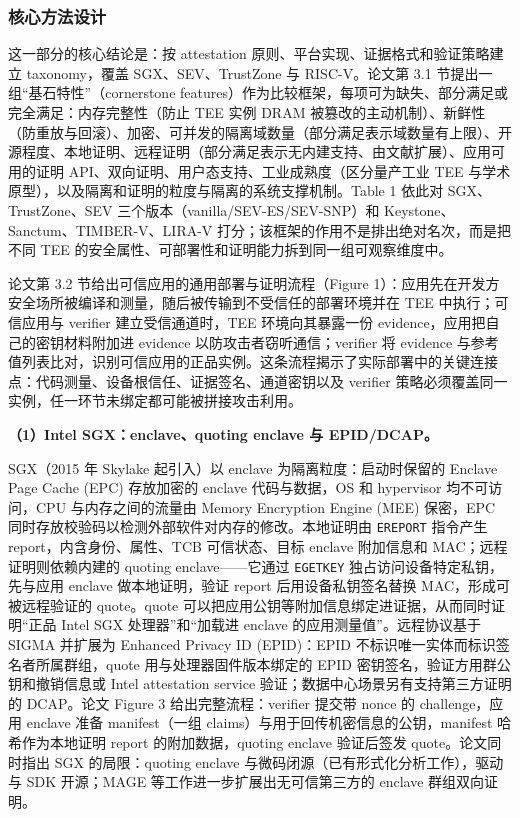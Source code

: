 \documentclass[11pt]{ctexart}
\begin{document}
\subsubsection{核心方法设计}
这一部分的核心结论是：按 attestation 原则、平台实现、证据格式和验证策略建立 taxonomy，覆盖 SGX、SEV、TrustZone 与 RISC-V。论文第 3.1 节提出一组“基石特性”（cornerstone features）作为比较框架，每项可为缺失、部分满足或完全满足：内存完整性（防止 TEE 实例 DRAM 被篡改的主动机制）、新鲜性（防重放与回滚）、加密、可并发的隔离域数量（部分满足表示域数量有上限）、开源程度、本地证明、远程证明（部分满足表示无内建支持、由文献扩展）、应用可用的证明 API、双向证明、用户态支持、工业成熟度（区分量产工业 TEE 与学术原型），以及隔离和证明的粒度与隔离的系统支撑机制。Table 1 依此对 SGX、TrustZone、SEV 三个版本（vanilla/SEV-ES/SEV-SNP）和 Keystone、Sanctum、TIMBER-V、LIRA-V 打分；该框架的作用不是排出绝对名次，而是把不同 TEE 的安全属性、可部署性和证明能力拆到同一组可观察维度中。\par
论文第 3.2 节给出可信应用的通用部署与证明流程（Figure 1）：应用先在开发方安全场所被编译和测量，随后被传输到不受信任的部署环境并在 TEE 中执行；可信应用与 verifier 建立受信通道时，TEE 环境向其暴露一份 evidence，应用把自己的密钥材料附加进 evidence 以防攻击者窃听通信；verifier 将 evidence 与参考值列表比对，识别可信应用的正品实例。这条流程揭示了实际部署中的关键连接点：代码测量、设备根信任、证据签名、通道密钥以及 verifier 策略必须覆盖同一实例，任一环节未绑定都可能被拼接攻击利用。\par
\noindent\textbf{（1）Intel SGX：enclave、quoting enclave 与 EPID/DCAP。}\par
SGX（2015 年 Skylake 起引入）以 enclave 为隔离粒度：启动时保留的 Enclave Page Cache (EPC) 存放加密的 enclave 代码与数据，OS 和 hypervisor 均不可访问，CPU 与内存之间的流量由 Memory Encryption Engine (MEE) 保密，EPC 同时存放校验码以检测外部软件对内存的修改。本地证明由 \texttt{EREPORT} 指令产生 report，内含身份、属性、TCB 可信状态、目标 enclave 附加信息和 MAC；远程证明则依赖内建的 quoting enclave——它通过 \texttt{EGETKEY} 独占访问设备特定私钥，先与应用 enclave 做本地证明，验证 report 后用设备私钥签名替换 MAC，形成可被远程验证的 quote。quote 可以把应用公钥等附加信息绑定进证据，从而同时证明“正品 Intel SGX 处理器”和“加载进 enclave 的应用测量值”。远程协议基于 SIGMA 并扩展为 Enhanced Privacy ID (EPID)：EPID 不标识唯一实体而标识签名者所属群组，quote 用与处理器固件版本绑定的 EPID 密钥签名，验证方用群公钥和撤销信息或 Intel attestation service 验证；数据中心场景另有支持第三方证明的 DCAP。论文 Figure 3 给出完整流程：verifier 提交带 nonce 的 challenge，应用 enclave 准备 manifest（一组 claims）与用于回传机密信息的公钥，manifest 哈希作为本地证明 report 的附加数据，quoting enclave 验证后签发 quote。论文同时指出 SGX 的局限：quoting enclave 与微码闭源（已有形式化分析工作），驱动与 SDK 开源；MAGE 等工作进一步扩展出无可信第三方的 enclave 群组双向证明。\par
\end{document}
